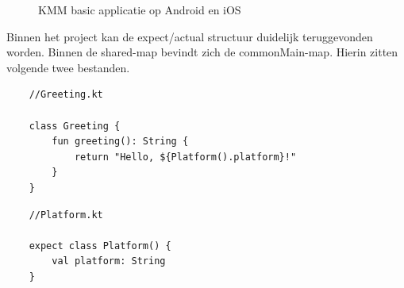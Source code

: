 \begin{figure}
    \centering
    \qquad
    \caption{KMM basic applicatie op Android en iOS}
    \label{fig:M-kmm-basic}%
\end{figure}

Binnen het project kan de expect/actual structuur duidelijk teruggevonden worden. Binnen de shared-map bevindt zich de commonMain-map. Hierin zitten volgende twee bestanden.

\begin{lstlisting}
    //Greeting.kt
    
    class Greeting {
        fun greeting(): String {
            return "Hello, ${Platform().platform}!"
        }
    }
\end{lstlisting}
\begin{lstlisting}
    //Platform.kt
    
    expect class Platform() {
        val platform: String
    }
\end{lstlisting}

